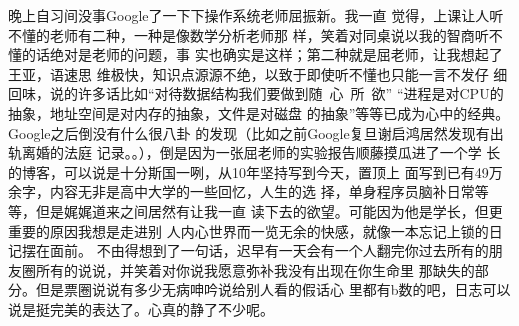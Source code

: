 晚上自习间没事Google了一下下操作系统老师屈振新。我一直
觉得，上课让人听不懂的老师有二种，一种是像数学分析老师那
样，笑着对同桌说以我的智商听不懂的话绝对是老师的问题，事
实也确实是这样；第二种就是屈老师，让我想起了王亚，语速思
维极快，知识点源源不绝，以致于即使听不懂也只能一言不发仔
细回味，说的许多话比如“对待数据结构我们要做到随~心~所~欲”
“进程是对CPU的抽象，地址空间是对内存的抽象，文件是对磁盘
的抽象”等等已成为心中的经典。Google之后倒没有什么很八卦
的发现（比如之前Google复旦谢启鸿居然发现有出轨离婚的法庭
记录。。），倒是因为一张屈老师的实验报告顺藤摸瓜进了一个学
长的博客，可以说是十分斯国一咧，从10年坚持写到今天，置顶上
面写到已有49万余字，内容无非是高中大学的一些回忆，人生的选
择，单身程序员脑补日常等等，但是娓娓道来之间居然有让我一直
读下去的欲望。可能因为他是学长，但更重要的原因我想是走进别
人内心世界而一览无余的快感，就像一本忘记上锁的日记摆在面前。
不由得想到了一句话，迟早有一天会有一个人翻完你过去所有的朋
友圈所有的说说，并笑着对你说我愿意弥补我没有出现在你生命里
那缺失的部分。但是票圈说说有多少无病呻吟说给别人看的假话心
里都有b数的吧，日志可以说是挺完美的表达了。心真的静了不少呢。
